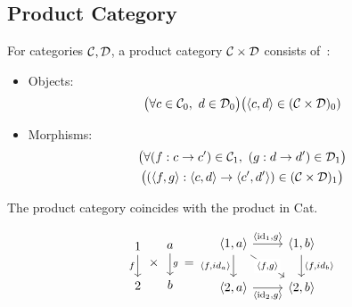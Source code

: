 \subsection{Product Category}
\begin{definition}
  For categories $\mathcal{C},\mathcal{D}$, a product category $\mathcal{C}\times \mathcal{D}$ consists
  of~\parencite[p.~16]{awodey:category_theory}:

  \begin{itemize}
    \item Objects:
      \[\big(\forall c \in \mathcal{C}_0,\ d \in \mathcal{D}_0\big)
        \big(\langle c, d\rangle\in (\mathcal{C}\times \mathcal{D})_0)\]
    \item Morphisms:
      \[
        \begin{gathered}
          \big(\forall (f: c \to c')\in \mathcal{C}_1,\ (g:d \to d')\in \mathcal{D}_1\big)\\
          \big((\langle f,g\rangle : \langle c,d\rangle \to \langle c', d'\rangle)\in (\mathcal{C}\times \mathcal{D})_1\big)
        \end{gathered}
      \]
  \end{itemize}
\end{definition}

\begin{remark}
  The product category coincides with the product in Cat.
\end{remark}

\begin{example}
  \[
    \begin{tikzcd}[ampersand replacement=\&]
      1 \\
      2
      \arrow["f"', from=1-1, to=2-1]
    \end{tikzcd}
    \times
    \begin{tikzcd}
      a \\
      b
      \arrow["g", from=1-1, to=2-1]
    \end{tikzcd}
    =
    \begin{tikzcd}[ampersand replacement=\&]
      {\langle1,a\rangle} \& {\langle1,b\rangle} \\
      {\langle2,a\rangle} \& {\langle2,b\rangle}
      \arrow["{\langle \id_1,g\rangle}", from=1-1, to=1-2]
      \arrow["{\langle f,id_a\rangle}"', from=1-1, to=2-1]
      \arrow["{\langle \id_2,g\rangle}"', from=2-1, to=2-2]
      \arrow["{\langle f,id_b\rangle}", from=1-2, to=2-2]
      \arrow["{\langle f,g\rangle}"{description}, from=1-1, to=2-2]
    \end{tikzcd}
  \]
\end{example}

